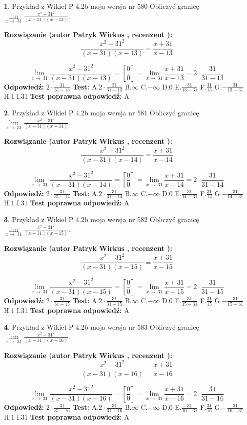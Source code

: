 \documentclass[12pt, a4paper]{article}
\theoremstyle{definition} %
\newtheorem{zad}{}
\newcommand{\zadStart}[1]{\begin{zad}#1\newline}
\newcommand{\zadStop}{\end{zad}}
\newcommand{\rozwStart}[2]{\noindent \textbf{Rozwiązanie (autor #1 , recenzent #2): }\newline}
\newcommand{\rozwStop}{\newline}
\newcommand{\odpStart}{\noindent \textbf{Odpowiedź:}\newline}
\newcommand{\odpStop}{\newline}
\newcommand{\testStart}{\noindent \textbf{Test:}\newline}
\newcommand{\testStop}{\newline}
\newcommand{\kluczStart}{\noindent \textbf{Test poprawna odpowiedź:}\newline}
\newcommand{\kluczStop}{\newline}
\begin{document}
\zadStart{Przykład z Wikieł P 4.2b moja wersja nr 580}
Obliczyć granicę $\lim\limits_{x\to\ 31}\frac{x^{2}-31^{2}}{(x-31)(x-13)}$.
\zadStop
\rozwStart{Patryk Wirkus}{}
$$\frac{x^{2}-31^{2}}{(x-31)(x-13)}=\frac{x+31}{x-13}$$

$$\lim\limits_{x\to\ 31}\frac{x^{2}-31^{2}}{(x-31)(x-13)}=[\frac{0}{0}]=\lim\limits_{x\to\ 31}\frac{x+31}{x-13}=2 \cdot \frac{31}{31-13}$$
\rozwStop
\odpStart
$2 \cdot \frac{31}{31-13}$
\odpStop
\testStart
A.$2 \cdot \frac{31}{31-13}$
B.$\infty$
C.$-\infty$
D.$0$
E.$\frac{31}{13-31}$
F.$\frac{31}{13}$
G.$-\frac{31}{13-31}$
H.$1$
I.$31$
\testStop
\kluczStart
A
\kluczStop



\zadStart{Przykład z Wikieł P 4.2b moja wersja nr 581}
Obliczyć granicę $\lim\limits_{x\to\ 31}\frac{x^{2}-31^{2}}{(x-31)(x-14)}$.
\zadStop
\rozwStart{Patryk Wirkus}{}
$$\frac{x^{2}-31^{2}}{(x-31)(x-14)}=\frac{x+31}{x-14}$$

$$\lim\limits_{x\to\ 31}\frac{x^{2}-31^{2}}{(x-31)(x-14)}=[\frac{0}{0}]=\lim\limits_{x\to\ 31}\frac{x+31}{x-14}=2 \cdot \frac{31}{31-14}$$
\rozwStop
\odpStart
$2 \cdot \frac{31}{31-14}$
\odpStop
\testStart
A.$2 \cdot \frac{31}{31-14}$
B.$\infty$
C.$-\infty$
D.$0$
E.$\frac{31}{14-31}$
F.$\frac{31}{14}$
G.$-\frac{31}{14-31}$
H.$1$
I.$31$
\testStop
\kluczStart
A
\kluczStop



\zadStart{Przykład z Wikieł P 4.2b moja wersja nr 582}
Obliczyć granicę $\lim\limits_{x\to\ 31}\frac{x^{2}-31^{2}}{(x-31)(x-15)}$.
\zadStop
\rozwStart{Patryk Wirkus}{}
$$\frac{x^{2}-31^{2}}{(x-31)(x-15)}=\frac{x+31}{x-15}$$

$$\lim\limits_{x\to\ 31}\frac{x^{2}-31^{2}}{(x-31)(x-15)}=[\frac{0}{0}]=\lim\limits_{x\to\ 31}\frac{x+31}{x-15}=2 \cdot \frac{31}{31-15}$$
\rozwStop
\odpStart
$2 \cdot \frac{31}{31-15}$
\odpStop
\testStart
A.$2 \cdot \frac{31}{31-15}$
B.$\infty$
C.$-\infty$
D.$0$
E.$\frac{31}{15-31}$
F.$\frac{31}{15}$
G.$-\frac{31}{15-31}$
H.$1$
I.$31$
\testStop
\kluczStart
A
\kluczStop



\zadStart{Przykład z Wikieł P 4.2b moja wersja nr 583}
Obliczyć granicę $\lim\limits_{x\to\ 31}\frac{x^{2}-31^{2}}{(x-31)(x-16)}$.
\zadStop
\rozwStart{Patryk Wirkus}{}
$$\frac{x^{2}-31^{2}}{(x-31)(x-16)}=\frac{x+31}{x-16}$$

$$\lim\limits_{x\to\ 31}\frac{x^{2}-31^{2}}{(x-31)(x-16)}=[\frac{0}{0}]=\lim\limits_{x\to\ 31}\frac{x+31}{x-16}=2 \cdot \frac{31}{31-16}$$
\rozwStop
\odpStart
$2 \cdot \frac{31}{31-16}$
\odpStop
\testStart
A.$2 \cdot \frac{31}{31-16}$
B.$\infty$
C.$-\infty$
D.$0$
E.$\frac{31}{16-31}$
F.$\frac{31}{16}$
G.$-\frac{31}{16-31}$
H.$1$
I.$31$
\testStop
\kluczStart
A
\kluczStop
\end{document}
